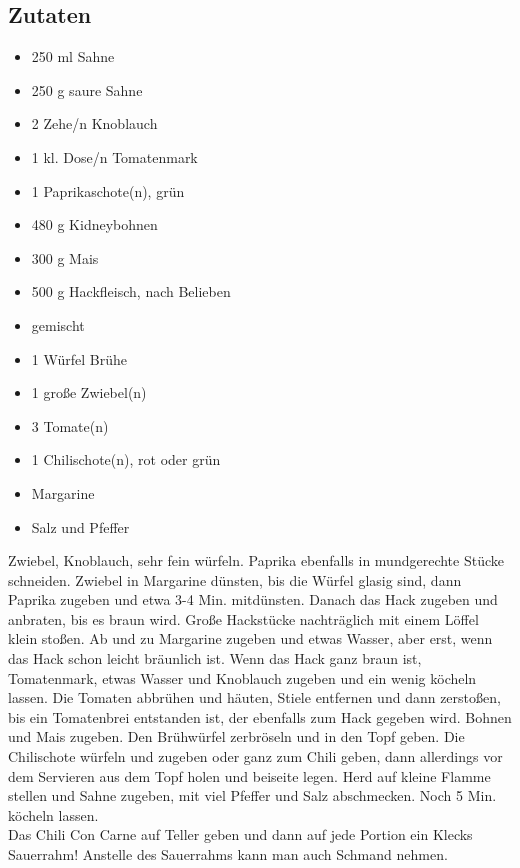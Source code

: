 \documentclass{article}
\begin{document}
	\subsection*{Zutaten}
	\begin{itemize}
		\item 250 ml Sahne
		\item 250 g saure Sahne
		\item 2 Zehe/n Knoblauch
		\item 1 kl. Dose/n Tomatenmark
		\item 1 Paprikaschote(n), grün
		\item 480 g Kidneybohnen
		\item 300 g Mais
		\item 500 g Hackfleisch, nach Belieben
		\item gemischt
		\item 1 Würfel Brühe
		\item 1 große Zwiebel(n)
		\item 3 Tomate(n)
		\item 1 Chilischote(n), rot oder grün
		\item Margarine
		\item Salz und Pfeffer
	\end{itemize}
	Zwiebel, Knoblauch, sehr fein würfeln. Paprika
	ebenfalls in mundgerechte Stücke schneiden.
	Zwiebel in Margarine dünsten, bis die Würfel glasig
	sind, dann Paprika zugeben und etwa 3-4 Min.
	mitdünsten. Danach das Hack zugeben und anbraten,
	bis es braun wird. Große Hackstücke nachträglich mit
	einem Löffel klein stoßen. Ab und zu Margarine
	zugeben und etwas Wasser, aber erst, wenn das
	Hack schon leicht bräunlich ist. Wenn das Hack ganz
	braun ist, Tomatenmark, etwas Wasser und
	Knoblauch zugeben und ein wenig köcheln lassen.
	Die Tomaten abbrühen und häuten, Stiele entfernen
	und dann zerstoßen, bis ein Tomatenbrei entstanden
	ist, der ebenfalls zum Hack gegeben wird. Bohnen
	und Mais zugeben. Den Brühwürfel zerbröseln und in
	den Topf geben. Die Chilischote würfeln und zugeben
	oder ganz zum Chili geben, dann allerdings vor dem
	Servieren aus dem Topf holen und beiseite legen.
	Herd auf kleine Flamme stellen und Sahne zugeben,
	mit viel Pfeffer und Salz abschmecken. Noch 5 Min.
	köcheln lassen. \\
	Das Chili Con Carne auf Teller geben und dann auf
	jede Portion ein Klecks Sauerrahm!
	Anstelle des Sauerrahms kann man auch Schmand
	nehmen.
\end{document}
